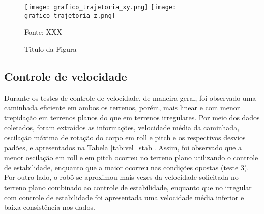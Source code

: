 \documentclass[../main.tex]{subfiles}
\begin{document}
  \begin{figure}[h]
    \centering
    \caption{Titulo da Figura}
    \texttt{[image: grafico\_trajetoria\_xy.png]}
    \texttt{[image: grafico\_trajetoria\_z.png]}
    
    Fonte: XXX
    \label{fig:grafico_trajetoria_xyz}
  \end{figure}

  \subsection{Controle de velocidade}
  Durante os testes de controle de velocidade, de maneira geral, foi observado uma caminhada eficiente em ambos os terrenos, porém, mais linear e com menor trepidação em terrenos planos do que em terrenos irregulares. Por meio dos dados coletados, foram extraídos as informações, velocidade média da caminhada, oscilação máxima de rotação do corpo em roll e pitch e os respectivos desvios padões, e apresentados na Tabela \ref{tab:vel_stab}. Assim, foi observado que a menor oscilação em roll e em pitch ocorreu no terreno plano utilizando o controle de estabilidade, enquanto que a maior ocorreu nas condições opostas (teste 3).  Por outro lado, o robô se aproximou mais vezes da velocidade solicitada no terreno plano combinado ao controle de estabilidade, enquanto que no irregular com controle de estabilidade foi apresentada uma velocidade média inferior e baixa consistência nos dados.
\end{document}
